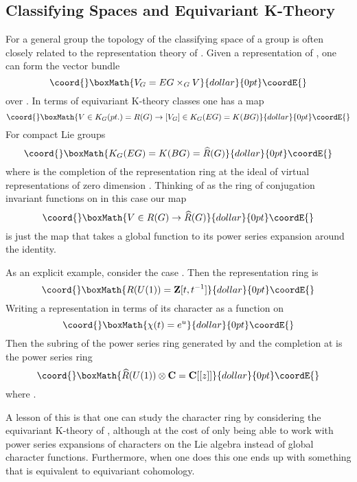 \documentclass[a4paper,a4paper]{article}
\theoremstyle{conjecture}
\begin{document}
\subsection{Classifying Spaces and Equivariant K-Theory}

For a general group \coordHE{} the topology of the classifying space of a
group \coordHE{} is often closely related to the representation theory of
\coordHE{}. Given a representation \coordHE{} of \coordHE{}, one can form the vector
bundle $$\coord{}\boxMath{V_G=EG \times _G V}{dollar}{0pt}\coordE{}$$over \coordHE{}. In terms of equivariant
K-theory classes one has a map 
$$\coord{}\boxMath{V\in K_G(pt.)=R(G)\rightarrow [V_G]\in K_G(EG)=K(BG)}{dollar}{0pt}\coordE{}$$ 
For compact Lie groups
$$\coord{}\boxMath{K_G(EG)=K(BG)=\widehat {R}(G)}{dollar}{0pt}\coordE{}$$ where \coordHE{} is the
completion of the representation ring at the ideal of virtual
representations of zero dimension \cite{AH}.  Thinking of \coordHE{} as the ring
of conjugation invariant functions on \coordHE{} in this case our map
$$\coord{}\boxMath{V\in R(G)\rightarrow \widehat{R}(G)}{dollar}{0pt}\coordE{}$$ is just the map that takes a global
function to its power series expansion around the identity.

As an explicit example, consider the case \coordHE{}. Then the representation ring is
$$\coord{}\boxMath{R(U(1))=\mathbf Z [t, t^{-1}]}{dollar}{0pt}\coordE{}$$
Writing a representation \coordHE{} in terms of its character \coordHE{} as a function on 
\coordHE{}  $$\coord{}\boxMath{\chi(t)=e^u}{dollar}{0pt}\coordE{}$$
Then 
\coordHE{} the subring of the power series ring \coordHE{}
generated by \coordHE{} and the completion at \coordHE{} is the power series ring
$$\coord{}\boxMath{\widehat{R}(U(1))\otimes \mathbf C={\mathbf C}[[z]]}{dollar}{0pt}\coordE{}$$
where \coordHE{}.

A lesson of this is that one can study the character ring
\coordHE{} by considering the
equivariant K-theory of \coordHE{}, although at the cost of
only being able to work with power series expansions of characters on the
Lie algebra instead of global character functions. Furthermore, when one
does this one ends up with something that is equivalent to equivariant cohomology.
 
\end{document}
